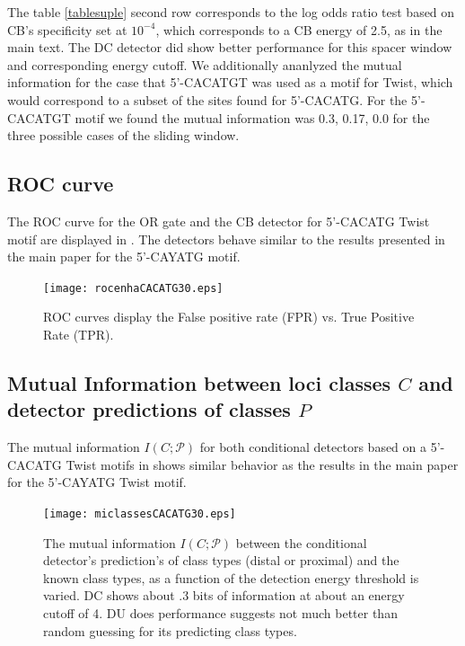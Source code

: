 \par

The  table \ref{tablesuple} second row corresponds to the log odds ratio test based on CB's specificity set at $10^{-4}$, which corresponds to a CB energy of 2.5, as in the main text.  The DC detector did show better performance for this spacer window and corresponding energy cutoff.  We additionally ananlyzed the mutual information for the case that 5'-CACATGT was used as a motif for Twist, which would correspond to a subset of the sites found for 5'-CACATG.  For the 5'-CACATGT motif we found the mutual information was 0.3, 0.17, 0.0 for the three possible cases of the sliding window.

\newpage

\subsection{ROC curve}
 The ROC curve for the OR gate and the CB detector for 5'-CACATG Twist motif are displayed in .  The detectors behave similar to the results presented in the main paper for the 5'-CAYATG motif.
\begin{figure}[!htbp]
\texttt{[image: rocenhaCACATG30.eps]}
\caption{ROC curves display the False positive rate (FPR) vs. True Positive Rate (TPR).  }
\end{figure}\label{rocfig2sup}


\newpage

\subsection{Mutual Information between loci classes $C$ and detector predictions of classes $P$}
The mutual information $I(C;\mathcal P)$ for both conditional detectors based on a 5'-CACATG Twist motifs in  shows similar behavior as the results in the main paper for the 5'-CAYATG Twist motif.   
\begin{figure}[!htbp]
\texttt{[image: miclassesCACATG30.eps]}
\caption{The mutual information $I(C;\mathcal P)$ between the conditional detector's prediction's of class types (distal or proximal) and the known class types, as a function of the detection energy threshold is varied.  DC shows about .3 bits of information at about an energy cutoff of 4.  DU does performance suggests not much better than random guessing for its predicting class types.  }
\end{figure}\label{miCPsup}

\newpage
